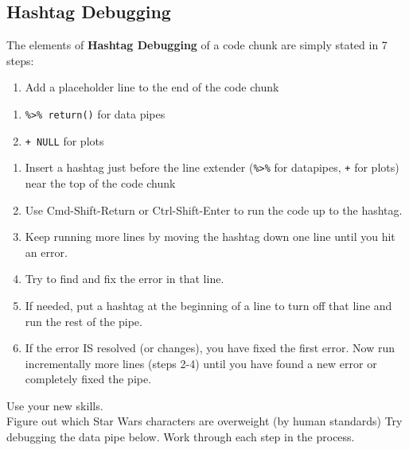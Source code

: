 \documentclass[
]{book}
\providecommand{\tightlist}{%
  \setlength{\itemsep}{0pt}\setlength{\parskip}{0pt}}
\begin{document}
\hypertarget{hashtag-debugging}{%
\subsection{Hashtag Debugging}\label{hashtag-debugging}}

The elements of \textbf{Hashtag Debugging} of a code chunk are simply stated in 7 steps:

\begin{enumerate}
\def\labelenumi{\arabic{enumi}.}
\tightlist
\item
  Add a placeholder line to the end of the code chunk
\end{enumerate}

\begin{enumerate}
\def\labelenumi{\alph{enumi}.}
\tightlist
\item
  \texttt{\%\textgreater{}\%\ return()} for data pipes
\item
  \texttt{+\ NULL} for plots
\end{enumerate}

\begin{enumerate}
\def\labelenumi{\arabic{enumi}.}
\setcounter{enumi}{1}
\tightlist
\item
  Insert a hashtag just before the line extender (\texttt{\%\textgreater{}\%} for datapipes, \texttt{+} for plots) near the top of the code chunk
\item
  Use Cmd-Shift-Return or Ctrl-Shift-Enter to run the code up to the hashtag.
\item
  Keep running more lines by moving the hashtag down one line until you hit an error.
\item
  Try to find and fix the error in that line.
\item
  If needed, put a hashtag at the beginning of a line to turn off that line and run the rest of the pipe.
\item
  If the error IS resolved (or changes), you have fixed the first error. Now run incrementally more lines (steps 2-4) until you have found a new error or completely fixed the pipe.
\end{enumerate}

Use your new skills.\\
Figure out which Star Wars characters are overweight (by human standards)
Try debugging the data pipe below.
Work through each step in the process.
\end{document}

